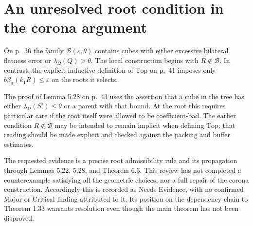 \documentclass[10pt]{article}
\begin{document}
\section*{An unresolved root condition in the corona argument}
On p. 36 the family \(\mathcal B(\varepsilon,\theta)\) contains cubes with either excessive bilateral flatness error or \(\lambda_\Omega(Q)>\theta\). The local construction begins with \(R\notin\mathcal B\). In contrast, the explicit inductive definition of \(\mathrm{Top}\) on p. 41 imposes only \(b\beta_\sigma(k_1R)\leq\varepsilon\) on the roots it selects.\par
The proof of Lemma 5.28 on p. 43 uses the assertion that a cube in the tree has either \(\lambda_\Omega(S')\leq\theta\) or a parent with that bound. At the root this requires particular care if the root itself were allowed to be coefficient-bad. The earlier condition \(R\notin\mathcal B\) may be intended to remain implicit when defining \(\mathrm{Top}\); that reading should be made explicit and checked against the packing and buffer estimates.\par
The requested evidence is a precise root admissibility rule and its propagation through Lemmas 5.22, 5.28, and Theorem 6.3. This review has not completed a counterexample satisfying all the geometric choices, nor a full repair of the corona construction. Accordingly this is recorded as Needs Evidence, with no confirmed Major or Critical finding attributed to it. Its position on the dependency chain to Theorem 1.33 warrants resolution even though the main theorem has not been disproved.\par
\end{document}
